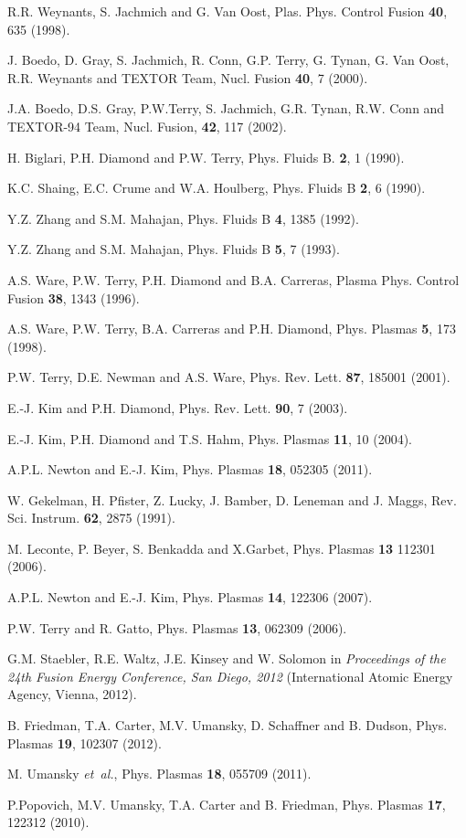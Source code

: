 \documentclass[aip,pop,amsmath,amssymb,peprint,superscriptaddress]{revtex4-1} %
\begin{document}
\begin{thebibliography}{10}
R.R. Weynants, S. Jachmich and G. Van Oost, Plas. Phys. Control Fusion {\bf 40}, 635 (1998).

J. Boedo, D. Gray, S. Jachmich, R. Conn, G.P. Terry, G. Tynan, G. Van Oost, R.R. Weynants and TEXTOR Team, Nucl. Fusion {\bf 40},  7  (2000).

J.A. Boedo, D.S. Gray, P.W.Terry, S. Jachmich, G.R. Tynan, R.W. Conn and TEXTOR-94 Team, Nucl. Fusion, {\bf 42}, 117 (2002).

H. Biglari, P.H. Diamond and P.W. Terry, Phys. Fluids B. {\bf 2},  1  (1990).

K.C. Shaing, E.C. Crume and W.A. Houlberg, Phys. Fluids B {\bf 2}, 6 (1990).

Y.Z. Zhang and S.M. Mahajan, Phys. Fluids B {\bf 4}, 1385 (1992).

Y.Z. Zhang and S.M. Mahajan, Phys. Fluids B {\bf 5}, 7 (1993).

A.S. Ware, P.W. Terry, P.H. Diamond and B.A. Carreras, Plasma Phys. Control Fusion {\bf 38},  1343  (1996).

A.S. Ware, P.W. Terry, B.A. Carreras and P.H. Diamond, Phys. Plasmas {\bf 5}, 173 (1998).

P.W. Terry, D.E. Newman and A.S. Ware, Phys. Rev. Lett. {\bf 87}, 185001  (2001).

E.-J. Kim and P.H. Diamond, Phys. Rev. Lett. {\bf 90}, 7 (2003).

E.-J. Kim, P.H. Diamond and T.S. Hahm, Phys. Plasmas {\bf 11},  10  (2004).

A.P.L. Newton and E.-J. Kim, Phys. Plasmas {\bf 18}, 052305 (2011).

W. Gekelman, H. Pfister, Z. Lucky, J. Bamber, D. Leneman and J. Maggs, Rev. Sci. Instrum. {\bf 62},  2875  (1991).

M. Leconte, P. Beyer, S. Benkadda and X.Garbet, Phys. Plasmas {\bf 13} 112301 (2006).

A.P.L. Newton and E.-J. Kim, Phys. Plasmas {\bf 14}, 122306 (2007).

P.W. Terry and R. Gatto, Phys. Plasmas {\bf 13}, 062309 (2006).

G.M. Staebler, R.E. Waltz, J.E. Kinsey and W. Solomon in \textit{Proceedings of the 24th Fusion Energy Conference, San Diego, 2012} (International Atomic Energy Agency, Vienna, 2012).

B. Friedman, T.A. Carter, M.V. Umansky, D. Schaffner and B. Dudson, Phys. Plasmas {\bf 19}, 102307 (2012).

M. Umansky {\it et~al.}, Phys. Plasmas {\bf 18},  055709  (2011).

P.Popovich, M.V. Umansky, T.A. Carter and B. Friedman, Phys. Plasmas {\bf 17}, 122312 (2010).

\end{thebibliography}
\end{document}
